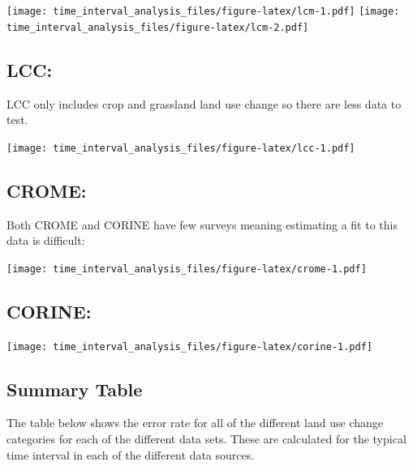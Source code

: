 \documentclass[
]{book}
\begin{document}
\texttt{[image: time\_interval\_analysis\_files/figure-latex/lcm-1.pdf]} \texttt{[image: time\_interval\_analysis\_files/figure-latex/lcm-2.pdf]}

\hypertarget{lcc}{%
\subsection{LCC:}\label{lcc}}

LCC only includes crop and grassland land use change so there are less data to test.

\texttt{[image: time\_interval\_analysis\_files/figure-latex/lcc-1.pdf]}

\hypertarget{crome}{%
\subsection{CROME:}\label{crome}}

Both CROME and CORINE have few surveys meaning estimating a fit to this data is difficult:

\texttt{[image: time\_interval\_analysis\_files/figure-latex/crome-1.pdf]}

\hypertarget{corine}{%
\subsection{CORINE:}\label{corine}}

\texttt{[image: time\_interval\_analysis\_files/figure-latex/corine-1.pdf]}

\hypertarget{summary-table}{%
\subsection{Summary Table}\label{summary-table}}

The table below shows the error rate for all of the different land use change categories for each of the different data sets. These are calculated for the typical time interval in each of the different data sources.
\end{document}
